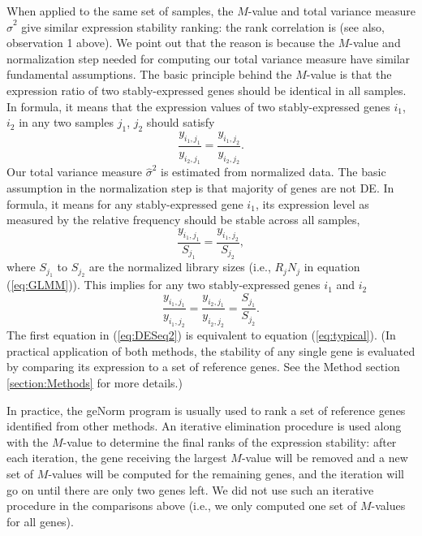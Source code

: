 		When applied to the same set of samples, the $M$-value and total variance
		measure $\hat\sigma^2$ give similar expression stability ranking: the rank
		correlation is \recallrankcorrelation (see also, observation 1 above).
		We point out that the reason is because the $M$-value and normalization step
		needed for computing our total variance measure have similar fundamental
		assumptions. 
		The basic principle
		behind the $M$-value is that the expression ratio of two stably-expressed
		genes should be identical in all samples. In formula, it means that the
		expression values of two stably-expressed genes $i_1$, $i_2$ in any two samples $j_1$, $j_2$
		should satisfy
		\begin{equation}\label{eq:typical}
			\dfrac{y_{i_1, j_1}}{y_{i_2, j_1}} = \dfrac{y_{i_1, j_2}}{y_{i_2, j_2}}.
		\end{equation} 
		Our total variance measure $\hat\sigma^2$ is estimated from normalized data.
		The basic assumption in the normalization step is that majority of genes are
		not DE. In formula, it means for any stably-expressed gene $i_1$, its expression
		level as measured by the relative frequency should be stable across all
		samples,
		\begin{equation}\label{eq:DESeq} 
			\frac{y_{i_1, j_1}}{S_{j_1}}= \dfrac{y_{i_1, j_2}}{S_{j_2}},
		\end{equation}
		where $S_{j_1}$ to $S_{j_2}$ are the normalized library sizes (i.e., $R_j N_j$ in equation (\ref{eq:GLMM})).
		This implies for any two stably-expressed genes $i_1$ and $i_2$
		\begin{equation}\label{eq:DESeq2} 
			\frac{y_{i_1, j_1}}{y_{i_1, j_2}} = \frac{y_{i_2, j_1}}{y_{i_2, j_2}} =
			\frac{S_{j_1}}{S_{j_2}}.
		\end{equation}
		The first equation in (\ref{eq:DESeq2}) is equivalent to equation
		(\ref{eq:typical}). (In practical application of both methods, the stability
		of any single gene is evaluated by comparing its expression to a set of
		reference genes. See the Method section \ref{section:Methods} for more details.)
		
		In practice, the geNorm program \citep{vandesompele2002accurate} is usually
		used to rank a set of reference genes identified from other methods.  An
		iterative elimination procedure is used along with the $M$-value to determine
		the final ranks of the expression stability:  after each iteration, the gene
		receiving the largest $M$-value will be removed and a new set of $M$-values
		will be computed for the remaining genes, and the iteration will go on until
		there are only two genes left.  We did not use such an iterative procedure in
		the comparisons above (i.e., we only computed one set of $M$-values for all
		genes). 
		
